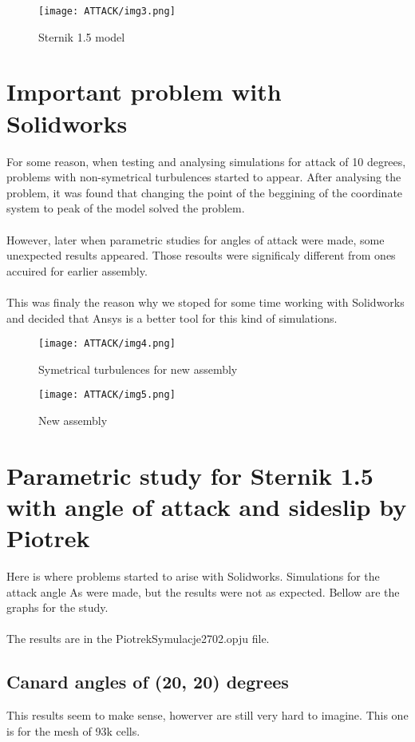 \begin{figure}[H]
    \centering
    \texttt{[image: ATTACK/img3.png]}
    \caption{Sternik 1.5 model}
\end{figure}
\newpage
\section{Important problem with Solidworks}
For some reason, when testing and analysing simulations for attack of 10 degrees, problems with 
non-symetrical turbulences started to appear. After analysing the problem, it was found that
changing the point of the beggining of the coordinate system to peak of the model solved the
problem. \\\\
However, later when parametric studies for angles of attack were made, some unexpected results
appeared. Those resoults were significaly different from ones accuired for earlier assembly.\\\\
This was finaly the reason why we stoped for some time working with Solidworks and decided that 
Ansys is a better tool for this kind of simulations. 

\begin{figure}[H]
    \centering
    \texttt{[image: ATTACK/img4.png]}
    \caption{Symetrical turbulences for new assembly}
\end{figure}

\begin{figure}[H]
    \centering
    \texttt{[image: ATTACK/img5.png]}
    \caption{New assembly}
\end{figure}

\section{Parametric study for Sternik 1.5 with angle of attack and sideslip by Piotrek}
Here is where problems started to arise with Solidworks. Simulations for the attack angle As
were made, but the results were not as expected. Bellow are the graphs for the study. \\\\
The results are in the PiotrekSymulacje2702.opju file.

\subsection{Canard angles of (20, 20) degrees}
This results seem to make sense, howerver are still very hard to imagine. This one is for the
mesh of 93k cells. 

